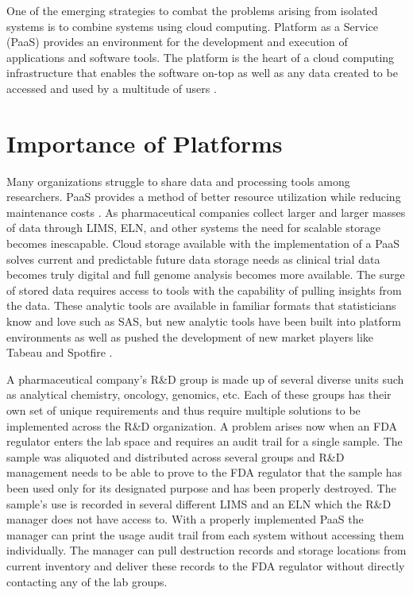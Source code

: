 \documentclass[sigconf]{acmart}
\begin{document}
One of the emerging strategies to combat the problems arising from isolated systems is to combine systems using cloud computing. Platform as a Service (PaaS) provides an environment for the development and execution of applications and software tools. The platform is the heart of a cloud computing infrastructure that enables the software on-top as well as any data created to be accessed and used by a multitude of users \cite{Ojala}.

\section{Importance of Platforms}	
Many organizations struggle to share data and processing tools among researchers. PaaS provides a method of better resource utilization while reducing maintenance costs \cite{Oh}. As pharmaceutical companies collect larger and larger masses of data through LIMS, ELN, and other systems the need for scalable storage becomes inescapable. Cloud storage available with the implementation of a PaaS solves current and predictable future data storage needs as clinical trial data becomes truly digital and full genome analysis becomes more available. The surge of stored data requires access to tools with the capability of pulling insights from the data. These analytic tools are available in familiar formats that statisticians know and love such as SAS, but new analytic tools have been built into platform environments as well as pushed the development of new market players like Tabeau and Spotfire \cite{Talia}.

A pharmaceutical company's R\&D group is made up of several diverse units such as analytical chemistry, oncology, genomics, etc. Each of these groups has their own set of unique requirements and thus require multiple solutions to be implemented across the R\&D organization. A problem arises now when an FDA regulator enters the lab space and requires an audit trail for a single sample. The sample was aliquoted and distributed across several groups and R\&D management needs to be able to prove to the FDA regulator that the sample has been used only for its designated purpose and has been properly destroyed. The sample's use is recorded in several different LIMS and an ELN which the R\&D manager does not have access to. With a properly implemented PaaS the manager can print the usage audit trail from each system without accessing them individually. The manager can pull destruction records and storage locations from current inventory and deliver these records to the FDA regulator without directly contacting any of the lab groups. 
\end{document}
